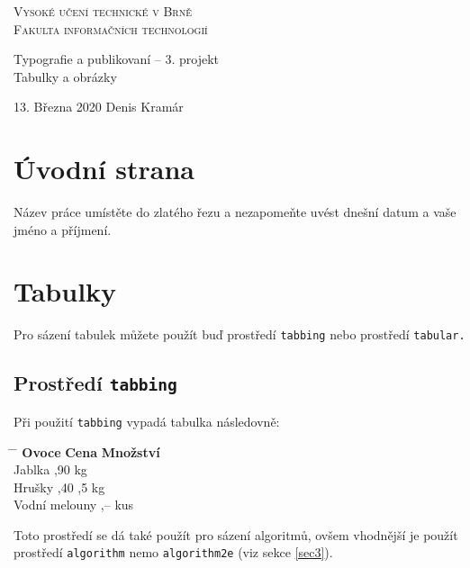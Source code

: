 \documentclass[a4paper, 11pt]{article}
\begin{document}
    \begin{titlepage}
        \begin{center}
            \textsc{
            {\Huge Vysoké učení technické v Brně\\[0.4em]}
            {\huge Fakulta informačních technologií}\\
            }
            
    
            {\LARGE Typografie a publikovaní -- 3. projekt} \\[0.3em]
            {\Huge Tabulky a obrázky}\\
            
            
            {\Large
            13. Března 2020
            \hfill
            Denis Kramár}
        \end{center}
    \end{titlepage}

    \section{Úvodní strana}
    Název práce umístěte do zlatého řezu a nezapomeňte uvést dnešní datum a vaše jméno a příjmení.
    
    \section{Tabulky}
    Pro sázení tabulek můžete použít buď prostředí \texttt{tabbing} nebo prostředí \texttt{tabular.}
    
    \subsection{Prostředí \texttt{tabbing}}
    Při použití \texttt{tabbing} vypadá tabulka následovně:
    
    \begin{tabbing}
    \hspace{2.7cm} \= \hspace{1.2cm} \= \kill
    \textbf{Ovoce} \> \textbf{Cena} \> \textbf{Množství} \\
    Jablka ,90  kg \\
    Hrušky ,40 ,5 kg \\
    Vodní melouny ,--  kus \\
    \end{tabbing}
    Toto prostředí se dá také použít pro sázení algoritmů, ovšem vhodnější je použít prostředí \texttt{algorithm} nemo \texttt{algorithm2e} (viz sekce \ref{sec3}). 
    
\end{document}
